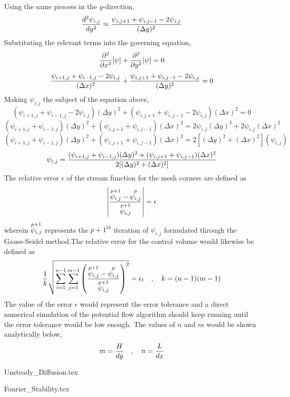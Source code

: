 \documentclass[a4paper, 12pt]{report}
\begin{document}
\begin{center}
Using the same process in the $y$-direction,
$$\frac{d^2\psi_{i,j}}{dy^2} \approx \frac{\psi_{i,j + 1} + \psi_{i,j - 1} - 2\psi_{i,j}}{(\Delta y)^2}$$
Substituting the relevant terms into the governing equation,
$$\frac{\partial^2}{\partial x^2}[\psi] + \frac{\partial^2}{\partial y^2}[\psi] = 0$$
$$\frac{\psi_{i + 1,j} + \psi_{i - 1,j} - 2\psi_{i,j}}{(\Delta x)^2} + \frac{\psi_{i,j + 1} + \psi_{i,j - 1} - 2\psi_{i,j}}{(\Delta y)^2} = 0$$
Making $\psi_{i,j}$ the subject of the equation above,
$$(\psi_{i + 1,j} + \psi_{i - 1,j} - 2\psi_{i,j})(\Delta y)^2 + (\psi_{i,j + 1} + \psi_{i,j - 1} - 2\psi_{i,j})(\Delta x)^2 = 0$$
$$(\psi_{i + 1,j} + \psi_{i - 1,j})(\Delta y)^2 + (\psi_{i,j + 1} + \psi_{i,j - 1})(\Delta x)^2 = 2\psi_{i,j}(\Delta y)^2 + 2\psi_{i,j}(\Delta x)^2$$
$$(\psi_{i + 1,j} + \psi_{i - 1,j})(\Delta y)^2 + (\psi_{i,j + 1} + \psi_{i,j - 1})(\Delta x)^2 = 2[(\Delta y)^2 + (\Delta x)^2](\psi_{i,j})$$
$$\psi_{i,j} = \frac{(\psi_{i + 1,j} + \psi_{i - 1,j})(\Delta y)^2 + (\psi_{i,j + 1} + \psi_{i,j - 1})(\Delta x)^2}{2[(\Delta y)^2 + (\Delta x)^2]}$$
The relative error $\epsilon$ of the stream function for the mesh corners are defined as
$$\left|\frac{\overset{p+1}{\psi_{i,j}} - \overset{p}{\psi_{i,j}}}{\overset{p+1}{\psi_{i,j}}}\right| = \epsilon$$
wherein $\displaystyle{\overset{p+1}{\psi_{i,j}}}$ represents the $p+1^{th}$ iteration of $\psi_{i,j}$ formulated through the Gauss-Seidel method.The relative error for the control volume would likewise be defined as
$$\frac{1}{k}\sqrt{\sum^{n-1}_{i = 1}\sum^{m-1}_{j = 1}\left(\frac{\overset{p+1}{\psi_{i,j}} - \overset{p}{\psi_{i,j}}}{\overset{p+1}{\psi_{i,j}}}\right)^2} = \epsilon_{t}\quad,\quad k = (n-1)(m-1)$$
The value of the error $\epsilon$ would represent the error tolerance and a direct numerical simulation of the potential flow algorithm should keep running until the error tolerance would be low enough. The values of $n$ and $m$ would be shown analytically below,
$$m = \frac{H}{dy}\quad,\quad n = \frac{L}{dx}$$
\begin{comment}
\end{comment}
{Unsteady_Diffusion.tex}
\begin{comment}
\end{comment}
{Fourier_Stability.tex}



\end{center}
\end{document}
